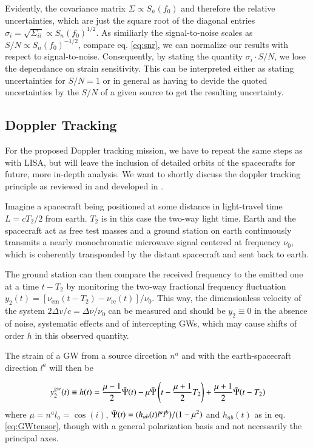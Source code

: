 \documentclass{aa}
\begin{document}
Evidently, the covariance matrix $\Sigma \propto S_n(f_0)$ and therefore the relative uncertainties, which are just the square root of the diagonal entries $\sigma_i=\sqrt{\Sigma_{ii}}\propto S_n(f_0)^{1/2}$. As similiarly the signal-to-noise scales as $S/N \propto S_n(f_0)^{-1/2}$, compare eq. \ref{eq:snr}, we can normalize our results with respect to signal-to-noise. Consequently, by stating the quantity $\sigma_i \cdot S/N$, we lose the dependance on strain sensitivity. This can be interpreted either as stating uncertainties for $S/N=1$ or in general as having to devide the quoted uncertainties by the $S/N$ of a given source to get the resulting uncertainty.

\subsection{Doppler Tracking}
\label{sec:IG}

For the proposed Doppler tracking mission, we have to repeat the same steps as with LISA, but will leave the inclusion of detailed orbits of the spacecrafts for future, more in-depth analysis. We want to shortly discuss the doppler tracking principle as reviewed in \citep{armstrong} and developed in \citep{estabrook}. 

Imagine a spacecraft being positioned at some distance in light-travel time $L=cT_2/2$ from earth. $T_2$ is in this case the two-way light time. Earth and the spacecraft act as free test masses and a ground station on earth continuously transmits a nearly monochromatic microwave signal centered at frequency $\nu_0$, which is coherently transponded by the distant spacecraft and sent back to earth. 

The ground station can then compare the received frequency to the emitted one at a time $t-T_2$ by monitoring the two-way fractional frequency fluctuation $y_2(t)=[ \nu_\mathrm{em}(t-T_2) -\nu_\mathrm{re}(t)]/\nu_0$. This way, the dimensionless velocity of the system $2\Delta v/c=\Delta \nu/\nu_0$ can be measured and should be $y_2\equiv 0$ in the absence of noise, systematic effects and of intercepting GWs, which may cause shifts of order $h$ in this observed quantity.

The strain of a GW from a source dircetion $n^a$ and with the earth-spacecraft direction $l^a$ will then be

\begin{equation} \label{eq:Doppler}
    y_2^{gw}(t) \equiv h(t) = \frac{\mu-1}{2} \Bar{\Psi}(t) - \mu \Bar{\Psi}\left(t-\frac{\mu+1}{2}T_2\right)+\frac{\mu+1}{2}\Bar{\Psi}(t-T_2)
\end{equation}
where $\mu=n^a l_a=\cos (i)$, $\Bar{\Psi}(t)=(h_{ab}(t)l^al^b)/(1-\mu^2)$ and $h_{ab}(t)$ as in eq. \ref{eq:GWtensor}, though with a general polarization basis and not necessarily the principal axes.
\end{document}
